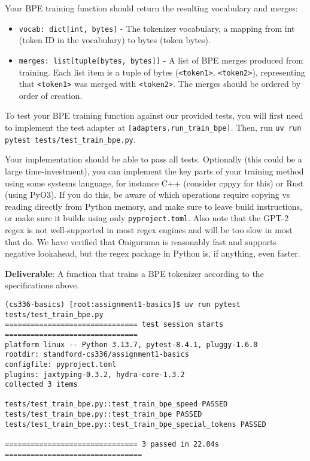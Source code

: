 Your BPE training function should return the resulting vocabulary and merges:

\begin{itemize}
    \item \lstinline{vocab: dict[int, bytes]} - The tokenizer vocabulary, a mapping from int (token ID in the vocabulary) to bytes (token bytes).
    \item \lstinline{merges: list[tuple[bytes, bytes]]} - A list of BPE merges produced from training. Each list item is a tuple of bytes (\texttt{<token1>}, \texttt{<token2>}), representing that \texttt{<token1>} was merged with \texttt{<token2>}. The merges should be ordered by order of creation.
\end{itemize}

To test your BPE training function against our provided tests, you will first need to implement the test adapter at \texttt{[adapters.run\_train\_bpe]}. Then, run \texttt{uv run pytest tests/test\_train\_bpe.py}.

Your implementation should be able to pass all tests. Optionally (this could be a large time-investment), you can implement the key parts of your training method using some systems language, for instance C++ (consider cppyy for this) or Rust (using PyO3). If you do this, be aware of which operations require copying vs reading directly from Python memory, and make sure to leave build instructions, or make sure it builds using only \texttt{pyproject.toml}. Also note that the GPT-2 regex is not well-supported in most regex engines and will be too slow in most that do. We have verified that Oniguruma is reasonably fast and supports negative lookahead, but the regex package in Python is, if anything, even faster.

\textbf{Deliverable}: A function that trains a BPE tokenizer according to the specifications above.

\begin{lstlisting}
(cs336-basics) [root:assignment1-basics]$ uv run pytest tests/test_train_bpe.py
=============================== test session starts ===============================
platform linux -- Python 3.13.7, pytest-8.4.1, pluggy-1.6.0
rootdir: standford-cs336/assignment1-basics
configfile: pyproject.toml
plugins: jaxtyping-0.3.2, hydra-core-1.3.2
collected 3 items                                                                         

tests/test_train_bpe.py::test_train_bpe_speed PASSED
tests/test_train_bpe.py::test_train_bpe PASSED
tests/test_train_bpe.py::test_train_bpe_special_tokens PASSED

=============================== 3 passed in 22.04s ================================
\end{lstlisting}

